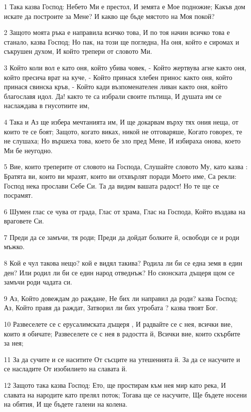 \par 1 Така казва Господ: Небето Ми е престол, И земята е Мое подножие; Какъв дом искате да построите за Мене? И какво ще бъде мястото на Моя покой?
\par 2 Защото моята ръка е направила всичко това, И по тоя начин всичко това е станало, казва Господ; Но пак, на този ще погледна, На оня, който е сиромах и съкрушен духом, И който трепери от словото Ми.
\par 3 Който коли вол е като оня, който убива човек, - Който жертвува агне както оня, който пресича врат на куче, - Който принася хлебен принос както оня, който принася свинска кръв, - Който кади възпоменателен ливан както оня, който благославя идол. Да! както те са избрали своите пътища, И душата им се наслаждава в гнусотиите им,
\par 4 Така и Аз ще избера мечтанията им, И ще докарвам върху тях ония неща, от които те се боят; Защото, когато виках, никой не отговаряше, Когато говорех, те не слушаха; Но вършеха това, което бе зло пред Мене, И избираха онова, което Ми бе неугодно.
\par 5 Вие, които треперите от словото на Господа, Слушайте словото Му, като казва : Братята ви, които ви мразят, които ви отхвърлят поради Моето име, Са рекли: Господ нека прослави Себе Си. Та да видим вашата радост! Но те ще се посрамят.
\par 6 Шумен глас се чува от града, Глас от храма, Глас на Господа, Който въздава на враговете Си.
\par 7 Преди да се замъчи, тя роди; Преди да дойдат болките й, освободи се и роди мъжко.
\par 8 Кой е чул такова нещо? кой е видял такива? Родила ли би се една земя в един ден? Или родил ли би се един народ отведнъж? Но сионската дъщеря щом се замъчи роди чадата си.
\par 9 Аз, Който довеждам до раждане, Не бих ли направил да роди? казва Господ; Аз, Който правя да раждат, Затворил ли бих утробата ? казва твоят Бог.
\par 10 Развеселете се с ерусалимската дъщеря , И радвайте се с нея, всички вие, които я обичате; Развеселете се с нея в радостта й, Всички вие, които скърбите за нея;
\par 11 За да сучите и се наситите От съсците на утешенията й. За да се насучите и се насладите От изобилието на славата й.
\par 12 Защото така казва Господ: Ето, ще простирам към нея мир като река, И славата на народите като прелял поток; Тогава ще се насучите, Ще бъдете носени на обятия, И ще бъдете галени на колена.
